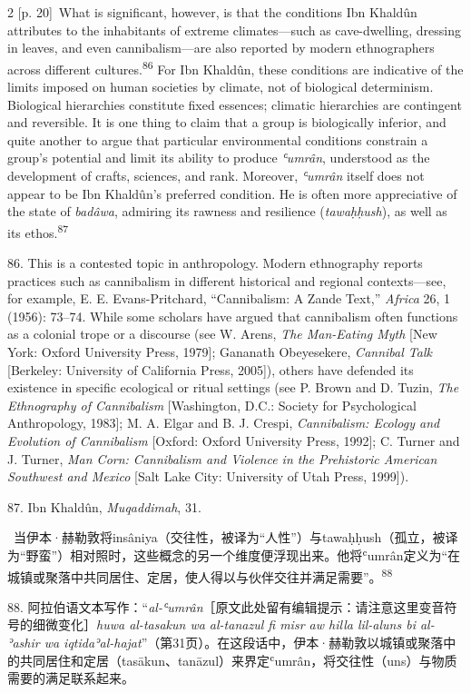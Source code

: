 \documentclass[10pt,a4paper]{article}
\begin{document}
\begin{paracol}{2}
{\scriptsize\color{gray} [p. 20]}\ What is significant, however, is that the conditions Ibn Khaldûn attributes to the inhabitants of extreme climates—such as cave-dwelling, dressing in leaves, and even cannibalism—are also reported by modern ethnographers across different cultures.\nobreak\textsuperscript{86} For Ibn Khaldûn, these conditions are indicative of the limits imposed on human societies by climate, not of biological determinism. Biological hierarchies constitute fixed essences; climatic hierarchies are contingent and reversible. It is one thing to claim that a group is biologically inferior, and quite another to argue that particular environmental conditions constrain a group’s potential and limit its ability to produce \textit{ʿumrân}, understood as the development of crafts, sciences, and rank. Moreover, \textit{ʿumrân} itself does not appear to be Ibn Khaldûn’s preferred condition. He is often more appreciative of the state of \textit{badâwa}, admiring its rawness and resilience (\textit{tawaḥḥush}), as well as its ethos.\nobreak\textsuperscript{87}\par{\small 86. This is a contested topic in anthropology. Modern ethnography reports practices such as cannibalism in different historical and regional contexts—see, for example, E. E. Evans-Pritchard, “Cannibalism: A Zande Text,” \textit{Africa} 26, 1 (1956): 73–74. While some scholars have argued that cannibalism often functions as a colonial trope or a discourse (see W. Arens, \textit{The Man-Eating Myth} [New York: Oxford University Press, 1979]; Gananath Obeyesekere, \textit{Cannibal Talk} [Berkeley: University of California Press, 2005]), others have defended its existence in specific ecological or ritual settings (see P. Brown and D. Tuzin, \textit{The Ethnography of Cannibalism} [Washington, D.C.: Society for Psychological Anthropology, 1983]; M. A. Elgar and B. J. Crespi, \textit{Cannibalism: Ecology and Evolution of Cannibalism} [Oxford: Oxford University Press, 1992]; C. Turner and J. Turner, \textit{Man Corn: Cannibalism and Violence in the Prehistoric American Southwest and Mexico} [Salt Lake City: University of Utah Press, 1999]).\par}{\small 87. Ibn Khaldûn, \textit{Muqaddimah}, 31.\par}
\switchcolumn*
{\scriptsize\color{gray} [p. 21]}\ 当伊本·赫勒敦将insâniya（交往性，被译为“人性”）与tawaḥḥush（孤立，被译为“野蛮”）相对照时，这些概念的另一个维度便浮现出来。他将ʿumrân定义为“在城镇或聚落中共同居住、定居，使人得以与伙伴交往并满足需要”。\nobreak\textsuperscript{88}\par{\small 88. 阿拉伯语文本写作：“\textit{al-ʿumrân}［原文此处留有编辑提示：请注意这里变音符号的细微变化］\textit{huwa al-tasakun wa al-tanazul fi misr aw hilla lil-aluns bi al-ʾashir wa iqtidaʾal-hajat}”（第31页）。在这段话中，伊本·赫勒敦以城镇或聚落中的共同居住和定居（tasākun、tanāzul）来界定ʿumrân，将交往性（uns）与物质需要的满足联系起来。\par}

\end{paracol}
\end{document}
